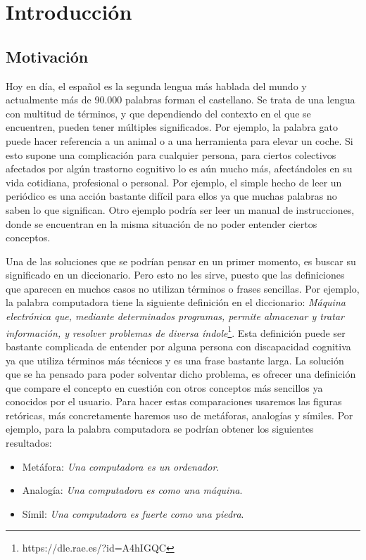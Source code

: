 \chapter{Introducción}
\label{cap:introduccion}



\section{Motivación}
\label{cap:sec:motivacion}

Hoy en día, el español es la segunda lengua más hablada del mundo y actualmente más de 90.000 palabras forman el castellano. 
Se trata de una lengua con multitud de términos, y que dependiendo del contexto en el que se encuentren, pueden tener múltiples significados. Por ejemplo, la palabra gato puede hacer referencia a un animal o a una herramienta para elevar un coche.
Si esto supone una complicación para cualquier persona, para ciertos colectivos afectados por algún trastorno cognitivo lo es aún mucho más, afectándoles en su vida cotidiana, profesional o personal. Por ejemplo, el simple hecho de leer un periódico es una acción bastante difícil para ellos ya que muchas palabras no saben lo que significan. Otro ejemplo podría ser leer un manual de instrucciones, donde se encuentran en la misma situación de no poder entender ciertos conceptos.

Una de las soluciones que se podrían pensar en un primer momento, es buscar su significado en un diccionario. Pero esto no les sirve, puesto que las definiciones que aparecen en muchos casos no utilizan términos o frases sencillas. Por ejemplo, la palabra computadora tiene la siguiente definición en el diccionario: 
\textit{Máquina electrónica que, mediante determinados programas, permite almacenar y tratar información, y resolver problemas de diversa índole}\footnote{https://dle.rae.es/?id=A4hIGQC}. 
Esta definición puede ser bastante complicada de entender por alguna persona con discapacidad cognitiva ya que utiliza términos más técnicos y es una frase bastante larga. La solución que se ha pensado para poder solventar dicho problema, es ofrecer una definición que compare el concepto en cuestión con otros conceptos más sencillos ya conocidos por el usuario. Para hacer estas comparaciones usaremos las figuras retóricas, más concretamente haremos uso de metáforas, analogías y símiles.
Por ejemplo, para la palabra computadora se podrían obtener los siguientes resultados:
\begin{itemize}
	\item Metáfora: \textit{Una computadora es un ordenador}.
	\item Analogía: \textit{Una computadora es como una máquina}.
	\item Símil: \textit{Una computadora es fuerte como una piedra}.
\end{itemize}

